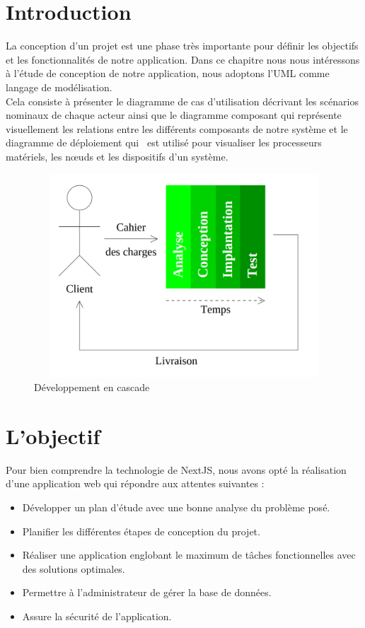 \documentclass[12pt]{report}
\begin{document}
\newpage

\section{Introduction}
\hspace*{0.16in}
La conception d’un projet est une phase très importante pour définir les objectifs et les fonctionnalités de notre application. Dans ce chapitre nous nous intéressons à l’étude de conception de notre application, nous adoptons l’UML comme langage de modélisation.
\\
\hspace*{0.16in}
Cela consiste à présenter le diagramme de cas d’utilisation décrivant les scénarios nominaux de chaque acteur ainsi que le diagramme composant qui représente visuellement les relations entre les différents composants de notre système et le diagramme de déploiement qui  est utilisé pour visualiser les processeurs matériels, les nœuds et les dispositifs d’un système.

\vspace{0.1in}

\begin{figure}[h]
\centering
    \includegraphics[width = 5in, height = 3in]{../images/analyseEtConception.png}
\caption{Développement en cascade}
\end{figure}

\section{L'objectif}
\hspace*{0.16in}
Pour bien comprendre la technologie de NextJS, nous avons opté la réalisation d’une application web qui répondre aux attentes suivantes :

\begin{itemize}
    \item Développer un plan d’étude avec une bonne analyse du problème posé.
    \item Planifier les différentes étapes de conception du projet.
    \item Réaliser une application englobant le maximum de tâches fonctionnelles avec des solutions optimales.
    \item Permettre à l’administrateur de gérer la base de données.
    \item Assure la sécurité de l'application.
\end{itemize}
\end{document}
